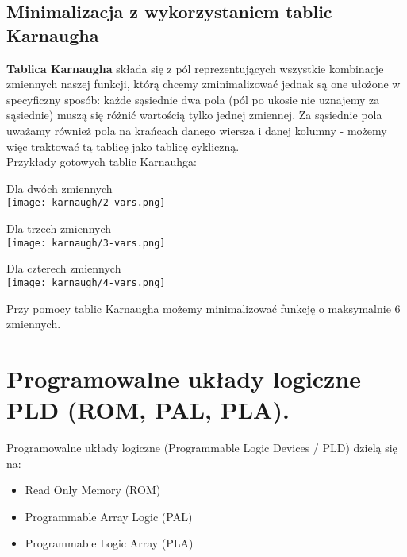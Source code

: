 \documentclass[main.tex]{subfiles}
\begin{document}
    \subsection{Minimalizacja z wykorzystaniem tablic Karnaugha}
    \begin{definition}
        \textbf{Tablica Karnaugha} składa się z pól reprezentujących wszystkie kombinacje zmiennych naszej funkcji, którą chcemy zminimalizować jednak są one ułożone w specyficzny sposób:
        każde sąsiednie dwa pola (pól po ukosie nie uznajemy za sąsiednie) muszą się różnić wartością tylko jednej zmiennej.
        Za sąsiednie pola uważamy również pola na krańcach danego wiersza i danej kolumny - możemy więc traktować tą tablicę jako tablicę cykliczną. \\

        Przykłady gotowych tablic Karnauhga: \\

        \begin{center}
            Dla dwóch zmiennych \\
            \texttt{[image: karnaugh/2-vars.png]}

            Dla trzech zmiennych \\
            \texttt{[image: karnaugh/3-vars.png]}

            Dla czterech zmiennych \\
            \texttt{[image: karnaugh/4-vars.png]}
        \end{center}

        Przy pomocy tablic Karnaugha możemy minimalizować funkcję o maksymalnie 6 zmiennych.
    \end{definition}


    \newpage

    \section{Programowalne układy logiczne PLD (ROM, PAL, PLA).}

    Programowalne układy logiczne (Programmable Logic Devices / PLD) dzielą się na:
    \begin{itemize}
        \item Read Only Memory (ROM)
        \item Programmable Array Logic (PAL)
        \item Programmable Logic Array (PLA)
    \end{itemize}
\end{document}
